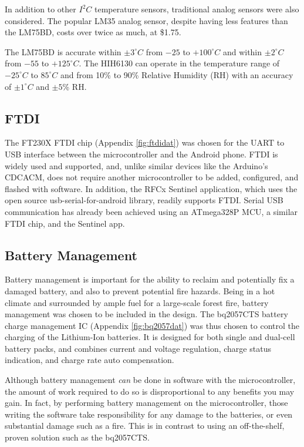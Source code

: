 \documentclass{article}
\numberwithin{figure}{section}
\numberwithin{equation}{section}
\begin{document}
{\bigskip
In addition to other $I^2 C$ temperature sensors, traditional analog sensors were also considered. The popular LM35 analog sensor, despite having less features than the LM75BD, costs over twice as much, at \$1.75.

\bigskip
The LM75BD is accurate within $\pm3^{\circ}C$ from $-25$ to $+100^{\circ}C$ and within $\pm2^{\circ}C$ from $-55$ to $+125^{\circ}C$. The HIH6130 can operate in the temperature range of $-25^{\circ}C$ to $85^{\circ}C$ and from 10\% to 90\% Relative Humidity (RH) with an accuracy of $\pm1^{\circ}C$ and $\pm5$\% RH.

\subsection{FTDI} \label{sect:ftdi_just}
The FT230X FTDI chip (Appendix \ref{fig:ftdidat}) was chosen for the UART to USB interface between the microcontroller and the Android phone. FTDI is widely used and supported, and, unlike similar devices like the Arduino's CDCACM, does not require another microcontroller to be added, configured, and flashed with software. In addition, the RFCx Sentinel application, which uses the open source usb-serial-for-android library, readily supports FTDI. Serial USB communication has already been achieved using an ATmega328P MCU, a similar FTDI chip, and the Sentinel app.

\subsection{Battery Management} \label{sect:battery_just}
Battery management is important for the ability to reclaim and potentially fix a damaged battery, and also to prevent potential fire hazards. Being in a hot climate and surrounded by ample fuel for a large-scale forest fire, battery management was chosen to be included in the design. The bq2057CTS battery charge management IC (Appendix \ref{fig:bq2057dat}) was thus chosen to control the charging of the Lithium-Ion batteries. It is designed for both single and dual-cell battery packs, and combines current and voltage regulation, charge status indication, and charge rate auto compensation.

\bigskip
Although battery management \textit{can} be done in software with the microcontroller, the amount of work required to do so is disproportional to any benefits you may gain. In fact, by performing battery management on the microcontroller, those writing the software take responsibility for any damage to the batteries, or even substantial damage such as a fire. This is in contrast to using an off-the-shelf, proven solution such as the bq2057CTS.

}
\end{document}
